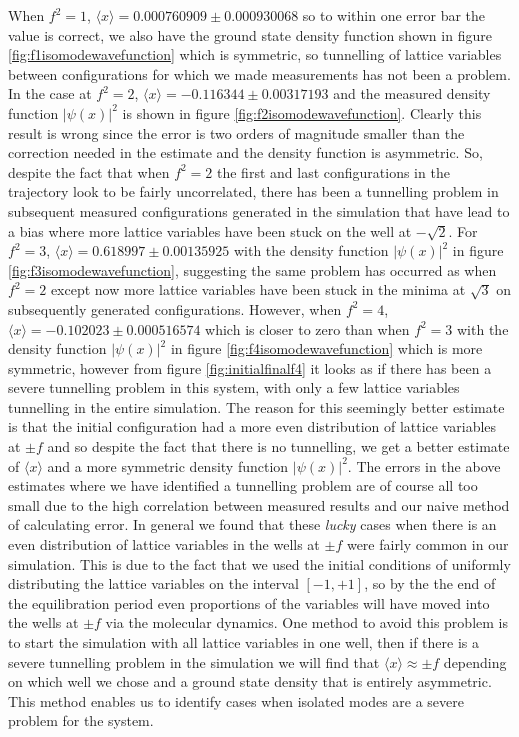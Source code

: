 \documentclass[12pt]{article}
\begin{document}
        When $f^2=1$, $\langle x \rangle = 0.000760909 \pm 0.000930068$ so to within one error bar the value is correct, we also have the ground state density function shown in figure \ref{fig:f1isomodewavefunction} which is symmetric, so tunnelling of lattice variables between configurations for which we made measurements has not been a problem. In the case at $f^2=2$, $\langle x \rangle = -0.116344 \pm 0.00317193$ and the measured density function $|\psi\left(x\right)|^2$ is shown in figure \ref{fig:f2isomodewavefunction}. Clearly this result is wrong since the error is two orders of magnitude smaller than the correction needed in the estimate and the density function is asymmetric. So, despite the fact that when $f^2=2$ the first and last configurations in the trajectory look to be fairly uncorrelated, there has been a tunnelling problem in subsequent measured configurations generated in the simulation that have lead to a bias where more lattice variables have been stuck on the well at $-\sqrt{2}$. For $f^2=3$, $\langle x \rangle =  0.618997 \pm 0.00135925$ with the density function $|\psi\left(x\right)|^2$ in figure \ref{fig:f3isomodewavefunction}, suggesting the same problem has occurred as when $f^2=2$ except now more lattice variables have been stuck in the minima at $\sqrt{3}$ on subsequently generated configurations. However, when $f^2=4$,  $\langle x \rangle =  -0.102023 \pm 0.000516574$ which is closer to zero than when $f^2=3$ with the density function $|\psi\left(x\right)|^2$ in figure \ref{fig:f4isomodewavefunction} which is more symmetric, however from figure \ref{fig:initialfinalf4} it looks as if there has been a severe tunnelling problem in this system, with only a few lattice variables tunnelling in the entire simulation. The reason for this seemingly better estimate is that the initial configuration had a more even distribution of lattice variables at $\pm f$ and so despite the fact that there is no tunnelling, we get a better estimate of $\langle x \rangle$ and a more symmetric density function $|\psi\left(x\right)|^2$. The errors in the above estimates where we have identified a tunnelling problem are of course all too small due to the high correlation between measured results and our naive method of calculating error. In general we found that these \textit{lucky} cases when there is an even distribution of lattice variables in the wells at $\pm f$ were fairly common in our simulation. This is due to the fact that we used the initial conditions of uniformly distributing the lattice variables on the interval $\left[-1,+1\right]$, so by the the end of the equilibration period even proportions of the variables will have moved into the wells at $\pm f$ via the molecular dynamics. One method to avoid this problem is to start the simulation with all lattice variables in one well, then if there is a severe tunnelling problem in the simulation we will find that $\langle x \rangle \approx \pm f$ depending on which well we chose and a ground state density that is entirely asymmetric. This method enables us to identify cases when isolated modes are a severe problem for the system.
\end{document}
